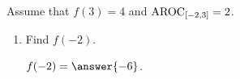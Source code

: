 \documentclass{ximera}
\author{Elizabeth Miller}
\begin{document}
\begin{exercise}

Assume that $f(3)=4$ and $\mathrm{AROC}_{[-2,3]}=2$.

\begin{enumerate}
\item Find $f(-2)$.

$f(-2) = \answer{-6}$.  
	
\end{enumerate}

\end{exercise}
\end{document}
